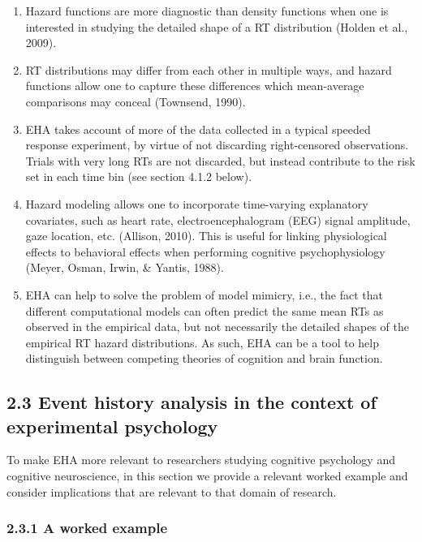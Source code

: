 \documentclass[
  man, donotrepeattitle,floatsintext]{apa6}
\begin{document}
\begin{enumerate}
\def\labelenumi{\arabic{enumi}.}
\item
  Hazard functions are more diagnostic than density functions when one is interested in studying the detailed shape of a RT distribution (Holden et al., 2009).
\item
  RT distributions may differ from each other in multiple ways, and hazard functions allow one to capture these differences which mean-average comparisons may conceal (Townsend, 1990).
\item
  EHA takes account of more of the data collected in a typical speeded response experiment, by virtue of not discarding right-censored observations. Trials with very long RTs are not discarded, but instead contribute to the risk set in each time bin (see section 4.1.2 below).
\item
  Hazard modeling allows one to incorporate time-varying explanatory covariates, such as heart rate, electroencephalogram (EEG) signal amplitude, gaze location, etc. (Allison, 2010). This is useful for linking physiological effects to behavioral effects when performing cognitive psychophysiology (Meyer, Osman, Irwin, \& Yantis, 1988).
\item
  EHA can help to solve the problem of model mimicry, i.e., the fact that different computational models can often predict the same mean RTs as observed in the empirical data, but not necessarily the detailed shapes of the empirical RT hazard distributions. As such, EHA can be a tool to help distinguish between competing theories of cognition and brain function.
\end{enumerate}

\subsection{2.3 Event history analysis in the context of experimental psychology}\label{event-history-analysis-in-the-context-of-experimental-psychology}

To make EHA more relevant to researchers studying cognitive psychology and cognitive neuroscience, in this section we provide a relevant worked example and consider implications that are relevant to that domain of research.

\subsubsection{2.3.1 A worked example}\label{a-worked-example}
\end{document}
